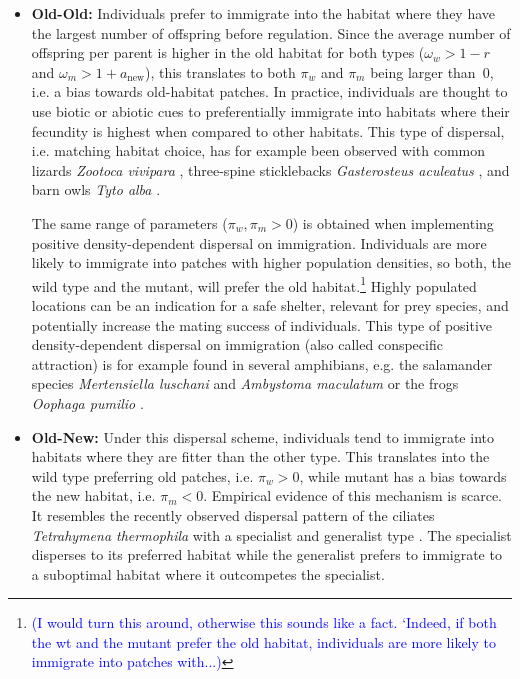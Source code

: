 \documentclass[a4paper,11pt]{article}
\newcommand{\francois}[1]{\textcolor{blue}{(#1)}}
\newcommand{\chg}[1]{\textcolor{change}{#1}}
\begin{document}
\begin{itemize}
	\item \textbf{Old-Old:} Individuals prefer to immigrate into the habitat where they have the largest number of offspring before regulation. \chg{Since the average number of offspring per parent is higher in the old habitat for both types ($\omega_w>1-r$ and $\omega_m>1+a_{\text{new}}$), this translates} to both $\pi_w$ and $\pi_m$ being larger than~$0$, i.e. a bias towards old-habitat patches. In practice, individuals are thought to use biotic or abiotic cues to preferentially immigrate into habitats where their fecundity is highest when compared to other habitats. This type of dispersal, i.e. matching habitat choice, has for example been observed with common lizards \textit{Zootoca vivipara} \citep{bestion_2015}, three-spine sticklebacks \textit{Gasterosteus aculeatus} \citep{bolnick_2009}, and barn owls \textit{Tyto alba} \citep{dreiss_2011}. 
	
	The same range of parameters ($\pi_w,\pi_m>0$) is obtained when implementing positive density-dependent dispersal \chg{on immigration. I}ndividuals are more likely to immigrate into patches with higher population densities, so both, the wild type and the mutant, will prefer the old habitat.\footnote{\francois{I would turn this around, otherwise this sounds like a fact. `Indeed, if both the wt and the mutant prefer the old habitat, individuals are more likely to immigrate into patches with...}} Highly populated locations can be an indication for a safe shelter, relevant for prey species, and potentially increase the mating success of individuals. This type of positive density-dependent dispersal on immigration (also called conspecific attraction) is for example found in several amphibians, e.g. the salamander species \textit{Mertensiella luschani} \citep{gautier_2006} and \textit{Ambystoma maculatum} \citep{greene_2016} or the frogs \textit{Oophaga pumilio} \citep{folt_2018}.
	
	\item \textbf{Old-New:} Under this dispersal scheme, individuals tend to immigrate into habitats where they are fitter than the other type. This translates into the wild type preferring old patches, i.e. $\pi_w>0$, while mutant has a bias towards the new habitat, i.e. $\pi_m<0$. 
	Empirical evidence of this mechanism is scarce. It resembles the recently observed dispersal pattern of the ciliates \textit{Tetrahymena thermophila} with a specialist and generalist type \citep{jacob_2018}. The specialist disperses to its preferred habitat while the generalist prefers to immigrate to a suboptimal habitat where it outcompetes the specialist. 
		

\end{itemize}
\end{document}
